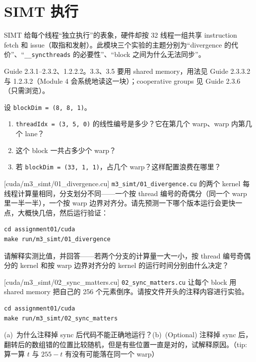 \documentclass[11pt,a4paper,fontset=none]{ctexart}
\begin{document}
\section{SIMT 执行}

SIMT 给每个线程“独立执行”的表象，硬件却按 32 线程一组共享 instruction fetch 和 issue（取指和发射）。此模块三个实验的主题分别为“divergence 的代价”、“\texttt{\_\_syncthreads} 的必要性”、“block 之间为什么无法同步”。

\begin{reading}
Guide 2.3.1--2.3.2、1.2.2.2。3.3、3.5 要用 shared memory，用法见 Guide 2.3.3.2 与 1.2.3.2（Module 4 会系统地读这一块）；cooperative groups 见 Guide 2.3.6（只需浏览）。
\end{reading}

设 \texttt{blockDim = (8, 8, 1)}。
\begin{enumerate}[label=(\alph*)]
  \item \texttt{threadIdx = (3, 5, 0)} 的线性编号是多少？它在第几个 warp、warp 内第几个 lane？
  \item 这个 block 一共占多少个 warp？
  \item 若 \texttt{blockDim = (33, 1, 1)}，占几个 warp？这样配置浪费在哪里？
\end{enumerate}

[cuda/m3\_simt/01\_divergence.cu]
\texttt{m3\_simt/01\_divergence.cu} 的两个 kernel 每线程计算量相同，分支划分不同——一个按 thread 编号的奇偶分（同一个 warp 里一半一半），一个按 warp 边界对齐分。请先预测一下哪个版本运行会更快一点，大概快几倍，然后运行验证：

\begin{lstlisting}
cd assignment01/cuda
make run/m3_simt/01_divergence
\end{lstlisting}

请解释实测比值，并回答——若两个分支的计算量一大一小，按 thread 编号奇偶分的 kernel 和按 warp 边界对齐分的 kernel 的运行时间分别由什么决定？

[cuda/m3\_simt/02\_sync\_matters.cu]
\texttt{02\_sync\_matters.cu} 让每个 block 用 shared memory 把自己的 256 个元素倒序。请按文件开头的注释内容进行实验。

\begin{lstlisting}
cd assignment01/cuda
make run/m3_simt/02_sync_matters
\end{lstlisting}

(a)~为什么注释掉 sync 后代码不能正确地运行？(b)~(Optional) 注释掉 sync 后，翻转后的数组错的位置比较随机，但是有些位置一直是对的，试解释原因。（tip: 算一算 $t$ 与 $255-t$ 有没有可能落在同一个 warp）
\end{document}
